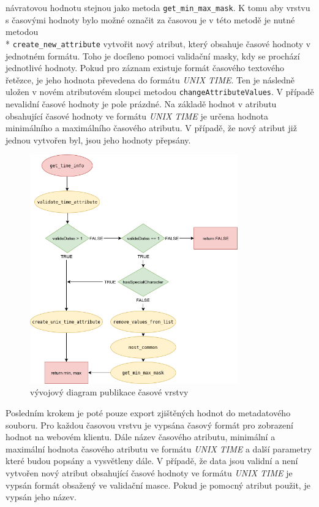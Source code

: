 \begin{itemize}
	návratovou hodnotu stejnou jako
	metoda \verb|get_min_max_mask|. K tomu aby vrstvu s časovými
	hodnoty bylo možné označit za časovou je v této metodě je
	nutné metodou \\* \verb|create_new_attribute| vytvořit nový
	atribut, který obsahuje časové hodnoty v jednotném
	formátu. Toho je docíleno pomoci validační masky, kdy se
	prochází jednotlivé hodnoty. Pokud pro záznam existuje formát
	časového textového řetězce, je jeho hodnota převedena do
	formátu \textit{UNIX TIME}. Ten je následně uložen v novém
	atributovém sloupci metodou \verb|changeAttributeValues|. V
	případě nevalidní časové hodnoty je pole prázdné. Na základě
	hodnot v atributu obsahující časové hodnoty ve
	formátu \textit{UNIX TIME} je určena hodnota minimálního a
	maximálního časového atributu.  V případě, že nový atribut již
	jednou vytvořen byl, jsou jeho hodnoty přepsány.
\end{itemize}

\begin{figure}[h!]
	\centering \includegraphics[width=0.8\textwidth]{../img/getTimeInfo.png} \caption{vývojový
	diagram publikace časové vrstvy} \label{fig:plugin-chart}
\end{figure}

Posledním krokem je poté pouze export zjištěných hodnot do
metadatového souboru. Pro každou časovou vrstvu je vypsána časový
formát pro zobrazení hodnot na webovém klientu. Dále název časového
atributu, minimální a maximální hodnota časového atributu ve
formátu \textit{UNIX TIME} a další parametry které budou popsány a
vysvětleny dále. V případě, že data jsou validní a není vytvořen nový
atribut obsahující časové hodnoty ve formátu \textit{UNIX TIME} je
vypsán formát obsažený ve validační masce. Pokud je pomocný atribut
použit, je vypsán jeho název.

